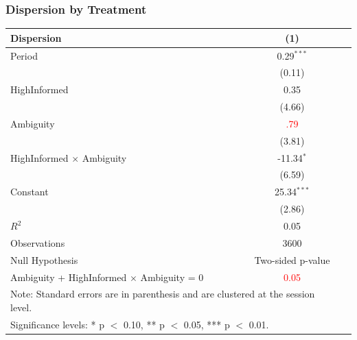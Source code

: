 \documentclass[red]{beamer}
\begin{document}
\begin{frame}
\frametitle{Dispersion by Treatment}
\begin{table}[htbp]\centering
 \begin{adjustbox}{width=10cm, totalheight=7cm}
\begin{tabular}{l*{2}{c}}
\hline\hline
Dispersion  & (1) & \\
\hline
Period                                      &  0.29$^{***}$  & \\
                                            &  (0.11) & \\
HighInformed            &   0.35 &\\
                                            &  (4.66)& \\
Ambiguity                                   &  \textcolor{red}{.79} &\\
                                            &  (3.81) & \\
HighInformed  $\times$ Ambiguity    & -11.34$^{*}$ & \\
                                            &  (6.59) &\\
Constant                                    & 25.34$^{***}$ & \\
                                            &  (2.86) & \\
\hline 
\vspace{2mm}
$R^2$                                       & 0.05 &  \\
Observations                                &   3600 &  \\
\hline\hline
Null Hypothesis                             & Two-sided p-value \\
\hline
Ambiguity + HighInformed  $\times$ Ambiguity = 0 & \textcolor{red}{0.05} \\
\hline
\multicolumn{2}{l}{\footnotesize{Note: Standard errors are in parenthesis and are clustered at the session level.}} \\
\multicolumn{2}{l}{\footnotesize{Significance levels: * p $<$ 0.10, ** p $<$ 0.05, *** p $<$ 0.01.}}
\end{tabular} \\ \vspace{3mm}
 \end{adjustbox}
\end{table}
\end{frame}
\end{document}

